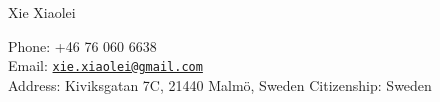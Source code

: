\documentclass[10pt,letterpaper]{article}
\def\name{Xie Xiaolei}
\begin{document}
{\huge \name}


\vspace{0.25in}

\begin{minipage}[t]{0.5\textwidth}
  Phone: +46 76 060 6638 \\
  Email: \href{mailto:xie.xiaolei@gmail.com}{\tt xie.xiaolei@gmail.com} \\
  Address: Kiviksgatan 7C, 21440 Malm\"{o}, Sweden
  Citizenship: Sweden \\
\end{minipage}

\end{document}
